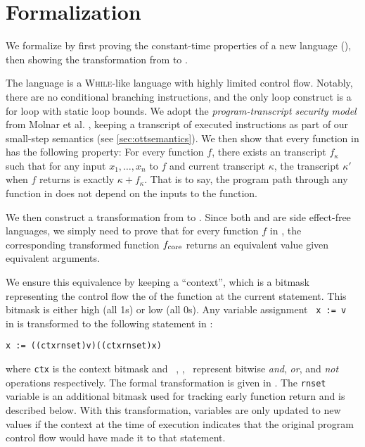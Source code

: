 \section{Formalization}
\label{sec:formalization}

We formalize \constc by first proving the constant-time properties of a new
language (\ccore), then showing the transformation from \constc to \ccore.

The language \ccore is a \textsc{While}-like language with highly limited
control flow. Notably, there are no conditional branching instructions, and the
only loop construct is a for loop with static loop bounds. We adopt the
\emph{program-transcript security model} from Molnar et al. \cite{molnar2005},
keeping a transcript of executed instructions as part of our small-step
semantics (see \autoref{sec:ottsemantics}). We then show that every function in
\ccore has the following property: For every function $f$, there exists an
transcript $f_\kappa$ such that for any input $x_1,\dots,x_n$ to $f$ and
current transcript $\kappa$, the transcript $\kappa'$ when $f$ returns is
exactly $\kappa + f_\kappa$. That is to say, the program path through any
function in \ccore does not depend on the inputs to the function.

We then construct a transformation from \constc to \ccore. Since both \ccore
and \constc are side effect-free languages, we simply need to prove that for
every function $f$ in \constc, the corresponding transformed function
$f_{\textnormal{core}}$ returns an equivalent value given equivalent arguments.

We ensure this equivalence by keeping a ``context'', which is a bitmask
representing the control flow the of the function at the current statement.
This bitmask is either high (all 1s) or low (all 0s).  Any variable assignment
~\texttt{x := v}~ in \constc is transformed to the following statement in
\ccore:
\begin{center}
  \texttt{x := ((ctx\bandx rnset)\bandx v)\borx(\bnot (ctx\bandx rnset)\bandx x)}
\end{center}
where \texttt{ctx} is the context bitmask and ~\band, \bor, \bnot\ represent
bitwise \emph{and}, \emph{or}, and \emph{not} operations respectively. The
formal transformation is given in . The \texttt{rnset}
variable is an additional bitmask used for tracking early function return and
is described below.  With this transformation, variables are only updated to
new values if the context at the time of execution indicates that the original
program control flow would have made it to that statement.

